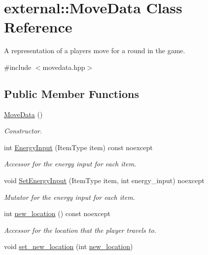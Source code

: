 \hypertarget{classexternal_1_1_move_data}{}\section{external\+:\+:Move\+Data Class Reference}
\label{classexternal_1_1_move_data}


A representation of a player\textquotesingle{}s move for a round in the game.  




{\ttfamily \#include $<$movedata.\+hpp$>$}

\subsection*{Public Member Functions}
\begin{DoxyCompactItemize}
\item 
\hyperlink{classexternal_1_1_move_data_a230c2389b03633b6b02928a867f59f27}{Move\+Data} ()
\begin{DoxyCompactList}\small\item\em Constructor. \end{DoxyCompactList}\item 
int \hyperlink{classexternal_1_1_move_data_acaef1f55196d7bb2fba3ebba2e9e9428}{Energy\+Input} (Item\+Type item) const noexcept
\begin{DoxyCompactList}\small\item\em Accessor for the energy input for each item. \end{DoxyCompactList}\item 
void \hyperlink{classexternal_1_1_move_data_aba5ad33ec9f3e4632750e35236581096}{Set\+Energy\+Input} (Item\+Type item, int energy\+\_\+input) noexcept
\begin{DoxyCompactList}\small\item\em Mutator for the energy input for each item. \end{DoxyCompactList}\item 
int \hyperlink{classexternal_1_1_move_data_a2469eb5c4a210b6ebd769254f190ad7e}{new\+\_\+location} () const noexcept
\begin{DoxyCompactList}\small\item\em Accessor for the location that the player travels to. \end{DoxyCompactList}\item 
void \hyperlink{classexternal_1_1_move_data_a81e78c6507a8cb0be615b23e9c94b7f4}{set\+\_\+new\+\_\+location} (int \hyperlink{classexternal_1_1_move_data_a2469eb5c4a210b6ebd769254f190ad7e}{new\+\_\+location})

\end{DoxyCompactItemize}
